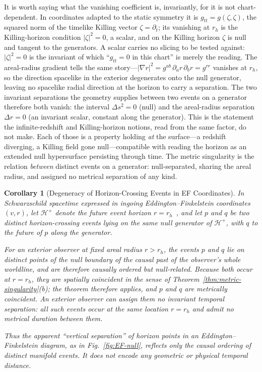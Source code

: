 \documentclass[11pt,a4paper]{article}
\theoremstyle{plain}
\newtheorem{corollary}{Corollary}
\theoremstyle{remark}
\begin{document}
It is worth saying what the vanishing coefficient is, invariantly, for it is not chart-dependent. In coordinates adapted to the static symmetry it is $g_{tt}=g(\zeta,\zeta)$, the squared norm of the timelike Killing vector $\zeta=\partial_t$; its vanishing at $r_h$ is the Killing-horizon condition $|\zeta|^2=0$, a scalar, and on the Killing horizon $\zeta$ is null and tangent to the generators. A scalar carries no slicing to be tested against: $|\zeta|^2=0$ is the invariant of which ``$g_{tt}=0$ in this chart'' is merely the reading. The areal-radius gradient tells the same story---$|\nabla r|^2=g^{ab}\,\partial_a r\,\partial_b r=g^{rr}$ vanishes at $r_h$, so the direction spacelike in the exterior degenerates onto the null generator, leaving no spacelike radial direction at the horizon to carry a separation. The two invariant separations the geometry supplies between two events on a generator therefore both vanish: the interval $\Delta s^2=0$ (null) and the areal-radius separation $\Delta r=0$ (an invariant scalar, constant along the generator). This is the statement the infinite-redshift and Killing-horizon notions, read from the same factor, do not make. Each of those is a property holding \emph{at} the surface---a redshift diverging, a Killing field gone null---compatible with reading the horizon as an extended null hypersurface persisting through time. The metric singularity is the relation \emph{between} distinct events on a generator: null-separated, sharing the areal radius, and assigned no metrical separation of any kind.

\begin{corollary}[Degeneracy of Horizon-Crossing Events in EF Coordinates]
In Schwarzschild spacetime expressed in ingoing Eddington--Finkelstein coordinates $(v,r)$, let $\mathcal{H}^{+}$ denote the future event horizon $r=r_h$~\cite{Hawking1973}, and let $p$ and $q$ be two distinct horizon-crossing events lying on the same null generator of $\mathcal{H}^{+}$, with $q$ to the future of $p$ along the generator.

For an exterior observer at fixed areal radius $r>r_h$, the events $p$ and $q$ lie on distinct points of the null boundary of the causal past of the observer's whole worldline, and are therefore causally ordered but null-related. Because both occur at $r=r_h$, they are spatially coincident in the sense of Theorem~\ref{thm:metric-singularity}(b); the theorem therefore applies, and $p$ and $q$ are metrically coincident. An exterior observer can assign them no invariant temporal separation: all such events occur at the same location $r=r_h$ and admit no metrical duration between them.

Thus the apparent ``vertical separation'' of horizon points in an Eddington--Finkelstein diagram, as in Fig.~\ref{fig:EF-null}, reflects only the causal ordering of distinct manifold events. It does not encode any geometric or physical temporal distance.
\end{corollary}
\end{document}
